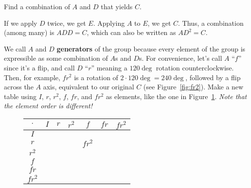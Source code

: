 \documentclass[../key.tex]{subfiles}
\begin{document}
\begin{outer_problem}
\item Find a combination of $A$ and $D$ that yields $C$.
\end{outer_problem}

If we apply $D$ twice, we get $E$. Applying $A$ to $E$, we get $C$. Thus, a combination (among many) is $ADD=C$, which can also be written as $AD^2=C$.

\begin{outer_problem}
\item We call $A$ and $D$ \textbf{generators} of the group because every element of the group is expressible as some combination of $A$s and $D$s. For convenience, let's call $A$ ``$f$'' since it's a flip, and call $D$ ``$r$'' meaning a $120\deg$ rotation counterclockwise. Then, for example, $fr^2$ is a rotation of $2\cdot 120\deg = 240\deg$, followed by a flip across the $A$ axis, equivalent to our original $C$ (see Figure~\ref{fig:fr2}). Make a new table using $I$, $r$, $r^2$, $f$, $fr$, and $fr^2$ as elements, like the one in Figure~\ref{fig:alttable}. \textit{Note that the element order is different!}
\end{outer_problem}

\begin{figure}[h]
	\begin{center}
		\begin{minipage}[b]{\textwidth}
			\centering
			\begin{tabular}{c|cccccc}
				\hline
				$\cdot$ & $I$ & $r$ & $r^2$ & $f$ & $fr$ & $fr^2$ \\ \hline 
				\rowcolor{light-gray}
				$I$    &   &   &   &   &   &   \\ 
				$r$    &   &   &   & $fr^2$  &   &   \\  
				\rowcolor{light-gray}
				$r^2$    &   &   &   &   &   &   \\ 
				$f$    &   &   &   &   &   &   \\  
				\rowcolor{light-gray}
				$fr$    &   &   &   &   &   &   \\ 
				$fr^2$    &   &   &   &   &   &   \\ \hline
			\end{tabular}
			\vspace*{0.5\baselineskip}
		\end{minipage}
	\end{center}
	\vspace*{-2\baselineskip}
	\begin{center}
		\begin{minipage}[t]{\textwidth}
			\label{fig:alttable}
		\end{minipage}
	\end{center}
	\vspace*{-2\baselineskip}
\end{figure}
\end{document}
